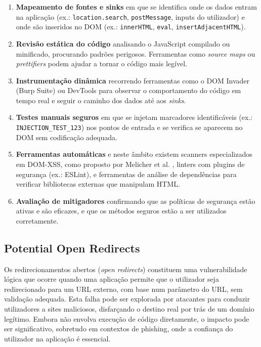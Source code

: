 \begin{enumerate}
    \item \textbf{Mapeamento de fontes e sinks} em que se identifica onde os dados entram na aplicação (ex.: \texttt{location.search}, \texttt{postMessage}, inputs do utilizador) e onde são inseridos no DOM (ex.: \texttt{innerHTML}, \texttt{eval}, \texttt{insertAdjacentHTML}).
    
    \item \textbf{Revisão estática do código} analisando o JavaScript compilado ou minificado, procurando padrões perigosos. Ferramentas como \textit{source maps} ou \textit{prettifiers} podem ajudar a tornar o código mais legível.
    
    \item \textbf{Instrumentação dinâmica} recorrendo ferramentas como o DOM Invader (Burp Suite) ou DevTools para observar o comportamento do código em tempo real e seguir o caminho dos dados até aos \textit{sinks}.
    
    \item \textbf{Testes manuais seguros} em que se injetam marcadores identificáveis (ex.: \texttt{INJECTION\_TEST\_123}) nos pontos de entrada e se verifica se aparecem no DOM sem codificação adequada.
    
    \item \textbf{Ferramentas automáticas} e neste âmbito existem scanners especializados em DOM-XSS, como proposto por Melicher et al. \cite{ref42}, linters com plugins de segurança (ex.: ESLint), e ferramentas de análise de dependências para verificar bibliotecas externas que manipulam HTML.
    
    \item \textbf{Avaliação de mitigadores} confirmando que as políticas de segurança estão ativas e são eficazes, e que os métodos seguros estão a ser utilizados corretamente.
\end{enumerate}

\subsection{Potential Open Redirects}
\label{subsec:potential-open-redirects}

Os redirecionamentos abertos (\textit{open redirects}) constituem uma vulnerabilidade lógica que ocorre quando uma aplicação permite que o utilizador seja redirecionado para um URL externo, com base num parâmetro do URL, sem validação adequada. Esta falha pode ser explorada por atacantes para conduzir utilizadores a sites maliciosos, disfarçando o destino real por trás de um domínio legítimo. Embora não envolva execução de código diretamente, o impacto pode ser significativo, sobretudo em contextos de phishing, onde a confiança do utilizador na aplicação é essencial.

